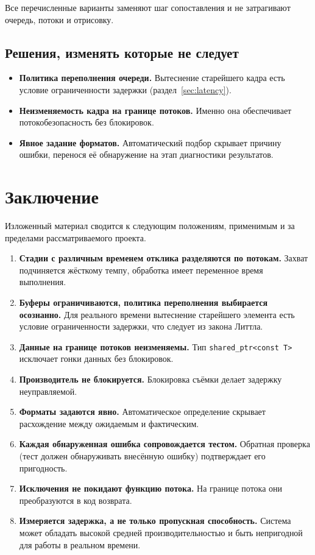 \documentclass[11pt,a4paper]{article}
\theoremstyle{definition}
\theoremstyle{remark}
\begin{document}
Все перечисленные варианты заменяют шаг сопоставления и не затрагивают
очередь, потоки и отрисовку.

\subsection{Решения, изменять которые не следует}

\begin{itemize}
  \item \textbf{Политика переполнения очереди.} Вытеснение старейшего кадра
        есть условие ограниченности задержки
        (раздел~\ref{sec:latency}).
  \item \textbf{Неизменяемость кадра на границе потоков.} Именно она
        обеспечивает потокобезопасность без блокировок.
  \item \textbf{Явное задание форматов.} Автоматический подбор скрывает
        причину ошибки, перенося её обнаружение на этап диагностики
        результатов.
\end{itemize}

\section{Заключение}

Изложенный материал сводится к следующим положениям, применимым и за
пределами рассматриваемого проекта.

\begin{enumerate}
  \item \textbf{Стадии с различным временем отклика разделяются по потокам.}
        Захват подчиняется жёсткому темпу, обработка имеет переменное время
        выполнения.
  \item \textbf{Буферы ограничиваются, политика переполнения выбирается
        осознанно.} Для реального времени вытеснение старейшего элемента есть
        условие ограниченности задержки, что следует из закона Литтла.
  \item \textbf{Данные на границе потоков неизменяемы.} Тип
        \texttt{shared\_ptr<const T>} исключает гонки данных без блокировок.
  \item \textbf{Производитель не блокируется.} Блокировка съёмки делает
        задержку неуправляемой.
  \item \textbf{Форматы задаются явно.} Автоматическое определение скрывает
        расхождение между ожидаемым и фактическим.
  \item \textbf{Каждая обнаруженная ошибка сопровождается тестом.} Обратная
        проверка (тест должен обнаруживать внесённую ошибку) подтверждает его
        пригодность.
  \item \textbf{Исключения не покидают функцию потока.} На границе потока
        они преобразуются в код возврата.
  \item \textbf{Измеряется задержка, а не только пропускная способность.}
        Система может обладать высокой средней производительностью и быть
        непригодной для работы в реальном времени.
\end{enumerate}
\end{document}
